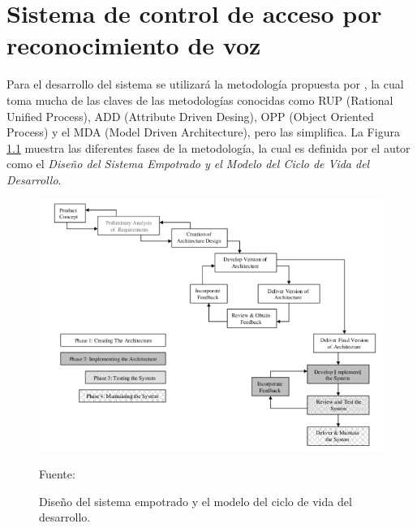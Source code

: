 \chapter{Sistema de control de acceso por reconocimiento de voz}

Para el desarrollo del sistema se utilizará la metodología propuesta por \citep{tammy} , la cual toma mucha de las claves de las metodologías conocidas como RUP (Rational Unified Process), ADD (Attribute Driven Desing), OPP (Object Oriented Process) y el MDA (Model Driven Architecture), pero las simplifica. La Figura \ref{fig:figura3.1} muestra las diferentes fases de la metodología, la cual es definida por el autor como el \textit{Diseño del Sistema Empotrado y el Modelo del Ciclo de Vida del Desarrollo}.

\begin{figure}[H]
\begin{center}
\includegraphics[width=1.0\textwidth]{Imagenes/Cap3/image001}
\end{center}
\begin{center}
\vskip -0.5cm
\caption{\small{Diseño del sistema empotrado y el modelo del ciclo de vida del desarrollo.}}
\label{fig:figura3.1}
{\small{Fuente: \cite{tammy}}}
\end{center}
\end{figure}

